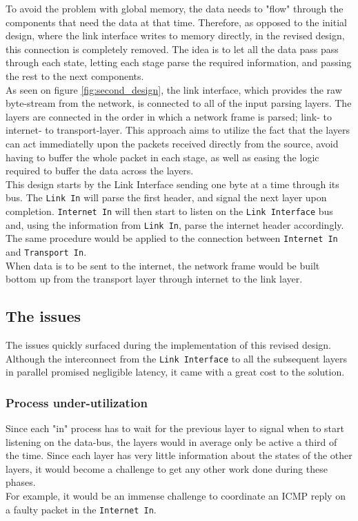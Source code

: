To avoid the problem with global memory, the data needs to "flow" through the 
components that need the data at that time. Therefore, as opposed to the initial 
design, where the link interface writes to memory directly, in the revised design, 
this connection is completely removed. The idea is to let all the data pass 
pass through each state, letting each stage parse the required information, and 
passing the rest to the next components.\\
As seen on figure \ref{fig:second_design}, the link interface, which
provides the raw byte-stream from the network, is connected to all of the input
parsing layers. The layers are connected in the order in which a network frame 
is parsed; link- to internet- to transport-layer. This approach aims to utilize
the fact that the layers can act immediatelly upon the packets received directly
from the source, avoid having to buffer the whole packet in each stage, as well 
as easing the logic required to buffer the data across the layers.\\
This design starts by the Link Interface sending one byte at a time through its bus. 
The \texttt{Link In} will parse the first header, and signal the next layer upon completion.
\texttt{Internet In} will then start to listen on the \texttt{Link Interface} bus
and, using the information from \texttt{Link In}, parse the internet header 
accordingly. The same procedure would be applied to the connection between 
\texttt{Internet In} and \texttt{Transport In}.\\
When data is to be sent to the internet, the network frame would be built bottom
up from the transport layer through internet to the link layer.

\subsection{The issues}
The issues quickly surfaced during the implementation of this revised design. Although 
the interconnect from the \texttt{Link Interface} to all the subsequent layers
in parallel promised negligible latency, it came with a great cost to the solution.

\subsubsection{Process under-utilization} \label{item:process_utilization}
Since each "in" process has to wait for the previous layer to signal when to 
start listening on the data-bus, the layers would in average only be active a third
of the time. Since each layer has very little information about the states of 
the other layers, it would become a challenge to get any other work done during
these phases.\\
For example, it would be an immense challenge to coordinate an ICMP reply on a 
faulty packet in the \texttt{Internet In}.

